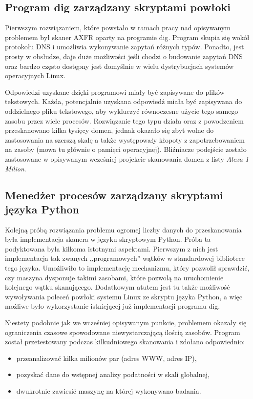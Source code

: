 \subsection{Program dig zarządzany skryptami powłoki}
Pierwszym rozwiązaniem, które powstało w ramach pracy nad opisywanym problemem był skaner AXFR oparty na programie dig\cite{isc}. Program skupia się wokół protokołu DNS i umożliwia wykonywanie zapytań różnych typów\cite{Liu:2006:DB:1197828}. Ponadto, jest prosty w obsłudze, daje duże możliwości jeśli chodzi o budowanie zapytań DNS oraz bardzo często dostępny jest domyślnie w wielu dystrybucjach systemów operacyjnych Linux. 

Odpowiedzi uzyskane dzięki programowi miały być zapisywane do plików tekstowych. Każda, potencjalnie uzyskana odpowiedź miała być zapisywana do oddzielnego pliku tekstowego, aby wykluczyć równoczesne użycie tego samego zasobu przez wiele procesów. Rozwiązanie tego typu działa oraz z powodzeniem przeskanowano kilka tysięcy domen, jednak okazało się zbyt wolne do zastosowania na szerszą skalę a także występowały kłopoty z zapotrzebowaniem na zasoby (mowa tu głównie o pamięci operacyjnej). Bliźniacze podejście zostało zastosowane w opisywanym wcześniej projekcie skanowania domen z listy \textit{Alexa 1 Milion}\cite{scans.io}.

\subsection{Menedżer procesów zarządzany skryptami języka Python}
Kolejną próbą rozwiązania problemu ogromej liczby danych do przeskanowania była implementacja skanera w języku skryptowym Python. Próba ta podyktowana była kilkoma istotnymi aspektami. Pierwszym z nich jest implementacja tak zwanych ,,programowych'' wątków w standardowej bibliotece tego języka. Umożliwiło to implementację mechanizmu, który pozwolił sprawdzić, czy maszyna dysponuje takimi zasobami, które pozwolą na uruchomienie kolejnego wątku skanującego. Dodatkowym atutem jest tu także możliwość wywoływania poleceń powłoki systemu Linux ze skryptu języka Python, a więc możliwe było wykorzystanie istniejącej już implementacji programu dig\cite{isc}.

Niestety podobnie jak we wcześniej opisywanym punkcie, problemem okazały się ograniczenia czasowe spowodowane niewystarczającą ilością zasobów. Program został przetestowany podczas kilkudniowego skanowania i zdołano odpowiednio:
\begin{itemize}
	\item przeanalizować kilka milionów par (adres WWW, adres IP),
	\item pozyskać dane do wstępnej analizy podatności w skali globalnej,
	\item dwukrotnie zawiesić maszynę na której wykonywano badania.
\end{itemize}

